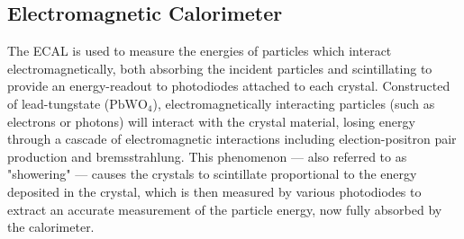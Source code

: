 \subsection{Electromagnetic Calorimeter}
\label{subsec:ecal}
The ECAL is used to measure the energies of particles which interact electromagnetically, both absorbing the incident particles and scintillating to provide an energy-readout to photodiodes attached to each crystal. Constructed of lead-tungstate ($\text{PbWO}_4$), electromagnetically interacting particles (such as electrons or photons) will interact with the crystal material, losing energy through a cascade of electromagnetic interactions including election-positron pair production and bremsstrahlung. This phenomenon --- also referred to as "showering" --- causes the crystals to scintillate proportional to the energy deposited in the crystal, which is then measured by various photodiodes to extract an accurate measurement of the particle energy, now fully absorbed by the calorimeter.

